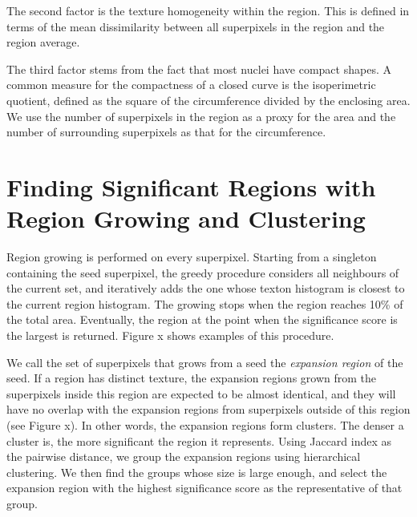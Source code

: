 \documentclass{llncs}
\begin{document}
The second factor is the texture homogeneity within the region. This is defined in terms of the mean dissimilarity between all superpixels in the region and the region average.

The third factor stems from the fact that most nuclei have compact shapes. A common measure for the compactness of a closed curve is the isoperimetric quotient, defined as the square of the circumference divided by the enclosing area. We use the number of superpixels in the region as a proxy for the area and the number of surrounding superpixels as that for the circumference.


\section{Finding Significant Regions with Region Growing and Clustering}

Region growing is performed on every superpixel. Starting from a singleton containing the seed superpixel, the greedy procedure considers all neighbours of the current set, and iteratively adds the one whose texton histogram is closest to the current region histogram. The growing stops when the region reaches 10\% of the total area. Eventually, the region at the point when the significance score is the largest is returned. Figure x shows examples of this procedure.


We call the set of superpixels that grows from a seed the \textit{expansion region} of the seed. If a region has distinct texture, the expansion regions grown from the superpixels inside this region are expected to be almost identical, and they will have no overlap with the expansion regions from superpixels outside of this region (see Figure x). In other words, the expansion regions form clusters. The denser a cluster is, the more significant the region it represents. Using Jaccard index as the pairwise distance, we group the expansion regions using hierarchical clustering. We then find the groups whose size is large enough, and select the expansion region with the highest significance score as the representative of that group.
\end{document}
